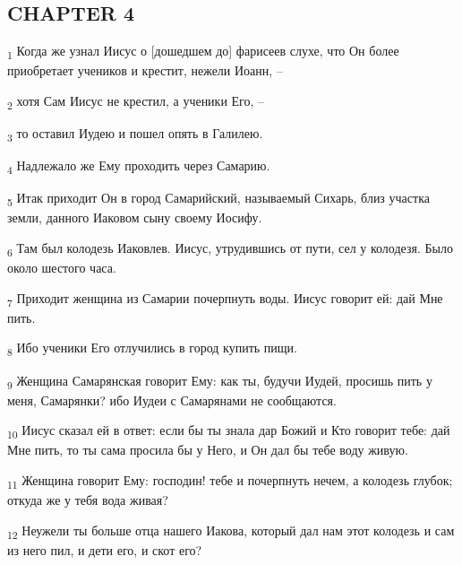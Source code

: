 \subsection{CHAPTER 4}
\begin{tcolorbox}
\textsubscript{1} Когда же узнал Иисус о [дошедшем до] фарисеев слухе, что Он более приобретает учеников и крестит, нежели Иоанн, --
\end{tcolorbox}
\begin{tcolorbox}
\textsubscript{2} хотя Сам Иисус не крестил, а ученики Его, --
\end{tcolorbox}
\begin{tcolorbox}
\textsubscript{3} то оставил Иудею и пошел опять в Галилею.
\end{tcolorbox}
\begin{tcolorbox}
\textsubscript{4} Надлежало же Ему проходить через Самарию.
\end{tcolorbox}
\begin{tcolorbox}
\textsubscript{5} Итак приходит Он в город Самарийский, называемый Сихарь, близ участка земли, данного Иаковом сыну своему Иосифу.
\end{tcolorbox}
\begin{tcolorbox}
\textsubscript{6} Там был колодезь Иаковлев. Иисус, утрудившись от пути, сел у колодезя. Было около шестого часа.
\end{tcolorbox}
\begin{tcolorbox}
\textsubscript{7} Приходит женщина из Самарии почерпнуть воды. Иисус говорит ей: дай Мне пить.
\end{tcolorbox}
\begin{tcolorbox}
\textsubscript{8} Ибо ученики Его отлучились в город купить пищи.
\end{tcolorbox}
\begin{tcolorbox}
\textsubscript{9} Женщина Самарянская говорит Ему: как ты, будучи Иудей, просишь пить у меня, Самарянки? ибо Иудеи с Самарянами не сообщаются.
\end{tcolorbox}
\begin{tcolorbox}
\textsubscript{10} Иисус сказал ей в ответ: если бы ты знала дар Божий и Кто говорит тебе: дай Мне пить, то ты сама просила бы у Него, и Он дал бы тебе воду живую.
\end{tcolorbox}
\begin{tcolorbox}
\textsubscript{11} Женщина говорит Ему: господин! тебе и почерпнуть нечем, а колодезь глубок; откуда же у тебя вода живая?
\end{tcolorbox}
\begin{tcolorbox}
\textsubscript{12} Неужели ты больше отца нашего Иакова, который дал нам этот колодезь и сам из него пил, и дети его, и скот его?
\end{tcolorbox}
